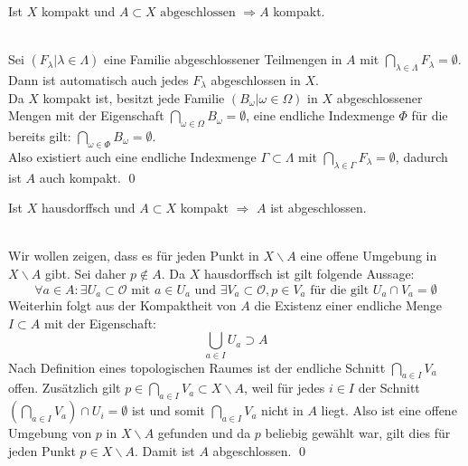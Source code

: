\begin{Satz}\label{satz:abgeschlkomp}
		Ist \(X\) kompakt und \(A \subset X \mbox{ abgeschlossen } \Rightarrow A\) kompakt.
\end{Satz}
%
	\\
 	Sei \((F_{\lambda} | \lambda \in \Lambda) \) eine Familie abgeschlossener Teilmengen in \(A\) mit \( \bigcap_{\lambda \in \Lambda } F_{\lambda} = \emptyset \).\\
	Dann ist automatisch auch jedes \(F_{\lambda} \) abgeschlossen in \(X\).\\
	Da \(X\) kompakt ist, besitzt jede Familie \((B_{\omega} | \omega \in \Omega) \) in \(X\) abgeschlossener Mengen mit der Eigenschaft 
	\( \bigcap_{\omega \in \Omega} B_{\omega} = \emptyset\), eine 
	endliche Indexmenge \(\Phi \) für die bereits gilt: \( \bigcap_{\omega \in \Phi} B_{\omega} = \emptyset\).\\
	Also existiert auch eine endliche Indexmenge \( \Gamma \subset \Lambda \) mit \( \bigcap_{\lambda \in \Gamma } F_{\lambda} = \emptyset \), dadurch ist 
	\(A\) auch kompakt.
\qed
		
\begin{Satz}\label{satz:kompabgeschl}
	Ist \(X\) hausdorffsch und \(A \subset X \) kompakt \( \Rightarrow \) \(A\) ist abgeschlossen.
\end{Satz}
%
	\\
	Wir wollen zeigen, dass es für jeden Punkt in \(X \backslash A \) eine offene Umgebung in \(X \backslash A \) gibt. Sei daher \(p \notin A \).
	Da \(X\) hausdorffsch ist gilt folgende Aussage:
	\[ \forall a \in A : \exists U_{a} \subset \mathcal{O} \mbox{ mit }  a \in U_{a} \mbox{ und } \exists V_{a}\subset \mathcal{O}, p \in V_{a} 
		 \mbox{ für die gilt } U_{a} \cap V_{a} = \emptyset \] 
	Weiterhin folgt aus der Kompaktheit von \(A\) die Existenz einer endliche Menge \(I \subset A\) mit der Eigenschaft:
	\[ \bigcup_{a \in I} U_{a} \supset A \]
	Nach Definition eines topologischen Raumes ist der endliche Schnitt \(\bigcap_{a \in I} V_{a}\) offen. Zusätzlich gilt 
	\(p \in \bigcap_{a \in I} V_{a} \subset  X\backslash A \), weil für jedes \(i \in I\) der Schnitt \( ( \bigcap_{a \in I} V_a ) \cap U_i = \emptyset \) ist und 
	somit \(  \bigcap_{a \in I} V_a \) nicht in \(A\) liegt.
	Also ist eine offene Umgebung von \(p\) in \(X\backslash A\) gefunden und da \(p\) beliebig gewählt war, gilt dies für 
	jeden Punkt \(p \in X\backslash A\). Damit ist \(A\) abgeschlossen. 
\qed
	
